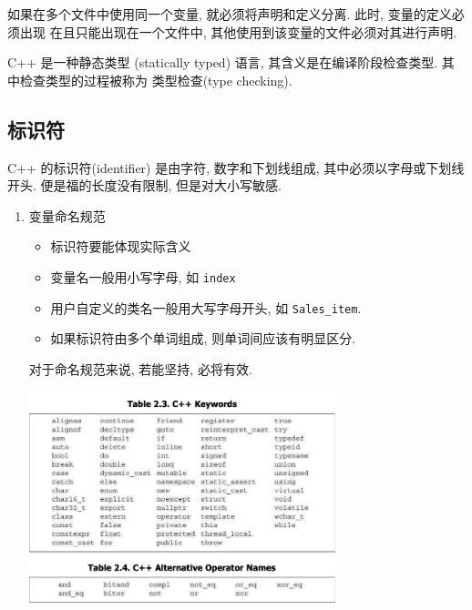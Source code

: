 \documentclass[lang=cn]{elegantbook}
\begin{document}
如果在多个文件中使用同一个变量, 就必须将声明和定义分离. 此时, 变量的定义必须出现
在且只能出现在一个文件中, 其他使用到该变量的文件必须对其进行声明.

\begin{definition}[静态类型]
C++ 是一种静态类型 (statically typed) 语言, 其含义是在编译阶段检查类型.
其中检查类型的过程被称为 类型检查(type checking).
\end{definition}

\subsection{标识符}
\label{sec:org256e18e}

C++ 的标识符(identifier) 是由字符, 数字和下划线组成, 其中必须以字母或下划线开头.
便是福的长度没有限制, 但是对大小写敏感.

\begin{enumerate}
\item 变量命名规范
\label{sec:org667ce03}

\begin{itemize}
\item 标识符要能体现实际含义
\item 变量名一般用小写字母, 如 \texttt{index}
\item 用户自定义的类名一般用大写字母开头, 如 \texttt{Sales\_item}.
\item 如果标识符由多个单词组成, 则单词间应该有明显区分.
\end{itemize}

\vspace*{1\baselineskip}
\begin{note}
对于命名规范来说, 若能坚持, 必将有效.
\end{note}

\begin{center}
\includegraphics[width=0.7\textwidth]{img/C++ 关键字与操作符替代名.png}
\end{center}
\end{enumerate}
\end{document}
